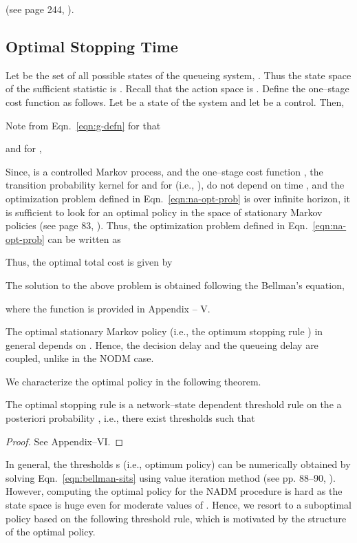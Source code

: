 \documentclass[acmtosn]{acmtrans2m}
\begin{document}
(see page 244, \cite{books.bertsekas00a}).

\subsection{Optimal Stopping Time }
\label{subsec:optimal-stopping-time}
Let  be the set of all possible states of the queueing system, . 
Thus the state space of the sufficient statistic is . Recall that the action
space is . Define the one--stage cost function 
 as follows. Let 
 be a state of the system and let  
be a control. Then,

Note from Eqn.~\ref{eqn:g-defn} for  that 

and for ,

Since,  is a controlled Markov process, and the one--stage cost
function , the transition probability kernel for 
and for  (i.e., ), do not 
depend on time , and the optimization problem defined in Eqn.~\ref{eqn:na-opt-prob} 
is over infinite horizon, it is sufficient 
to look for an optimal policy in the 
space of stationary Markov policies 
(see page 83, \cite{books.bertsekas00b}).
Thus, the optimization problem defined in Eqn.~\ref{eqn:na-opt-prob} can be written as 

Thus, the optimal total cost is given by 

The solution to the above problem is obtained following the Bellman's equation, 
 
where the function  is
provided in Appendix -- V.


\begin{remarks}
\label{thm:decision_queueing_coupling}
The optimal stationary Markov policy (i.e., the optimum stopping 
rule ) in general depends on . Hence, the decision 
delay and the queueing delay are coupled, unlike in the {\sf NODM} case. 
\end{remarks}

\noindent
We characterize the optimal policy in the following theorem.
\begin{theorem}
The optimal stopping rule  is a network--state dependent 
threshold rule on the a posteriori probability , i.e.,
there exist thresholds  such that
 
\end{theorem}
\begin{proof}
See Appendix--VI.
\end{proof}

In general, the thresholds s (i.e., optimum policy) 
can be numerically obtained by solving 
Eqn.~\ref{eqn:bellman-sits} using value iteration method 
(see pp. 88--90, \cite{books.bertsekas00b}). However, computing the optimal policy for the
{\sf NADM} procedure is hard as the state space is huge even for moderate 
values of . Hence, we resort to a suboptimal policy based on the 
following threshold rule, which is motivated by the structure of the 
optimal policy.    
\end{document}
